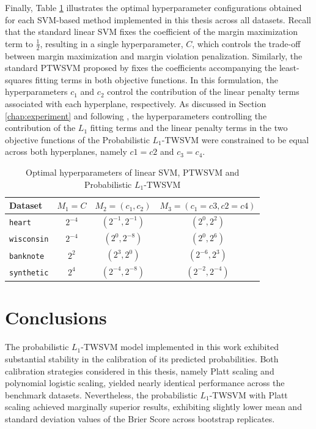 \documentclass[12pt]{report} %
\begin{document}
Finally, Table \ref{tab:hyperparameters-confgs} illustrates the optimal hyperparameter configurations obtained for each SVM-based method implemented in this thesis across all datasets. Recall that the standard linear SVM fixes the coefficient of the margin maximization term to $\frac{1}{2}$, resulting in a single hyperparameter, $C$, which controls the trade-off between margin maximization and margin violation penalization. Similarly, the standard PTWSVM proposed by \cite{shao2012probabilistic} fixes the coefficients accompanying the least-squares fitting terms in both objective functions. In this formulation, the hyperparameters $c_1$ and $c_2$ control the contribution of the linear penalty terms associated with each hyperplane, respectively. As discussed in Section \ref{chap:experiment} and following \cite{bai2014novel}, the hyperparameters controlling the contribution of the $L_1$ fitting terms and the linear penalty terms in the two objective functions of the Probabilistic $L_1$-TWSVM were constrained to be equal across both hyperplanes, namely $c1 = c2$ and $c_3 = c_4$.

\begin{table}[H]
\centering
\caption{Optimal hyperparameters of linear SVM, PTWSVM and Probabilistic $L_1$-TWSVM}
\label{tab:hyperparameters-confgs}
\begin{tabular}{lccc}
\hline
\textbf{Dataset} & $M_1 = C$ & $M_2 = (c_1, c_2)$ & $M_3 = (c_1 = c3, c2 = c4)$ \\
\hline
\texttt{heart} & $2^{-4}$ & $(2^{-1}, 2^{-1})$ & $(2^{0}, 2^{2})$ \\
\texttt{wisconsin} & $2^{-4} $ & $(2^{0}, 2^{-8})$ & $(2^{0}, 2^{6})$ \\
\texttt{banknote} & $2^{2}$ & $(2^{3}, 2^{0})$ & $(2^{-6}, 2^{3})$ \\
\texttt{synthetic} & $2^{4}$ & $(2^{-4}, 2^{-8})$ & $(2^{-2}, 2^{-4})$ \\
\hline
\end{tabular}
\end{table}



\chapter{Conclusions} \label{chap:conclusions}

The probabilistic $L_1$-TWSVM model implemented in this work exhibited substantial stability in the calibration of its predicted probabilities. Both calibration strategies considered in this thesis, namely Platt scaling and polynomial logistic scaling, yielded nearly identical performance across the benchmark datasets. Nevertheless, the probabilistic $L_1$-TWSVM with Platt scaling achieved marginally superior results, exhibiting slightly lower mean and standard deviation values of the Brier Score across bootstrap replicates.
\end{document}
